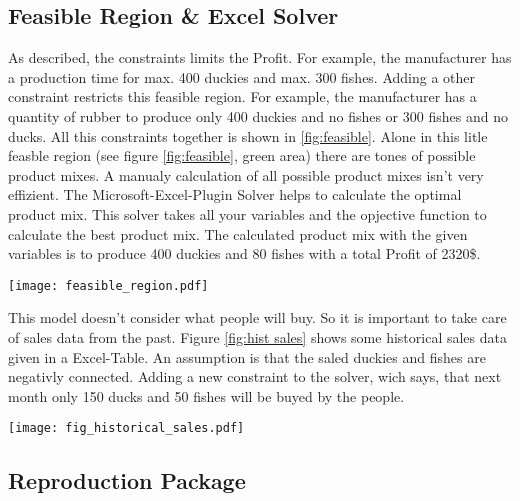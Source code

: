 \documentclass{article}
\begin{document}
\begin{multicols}{2}
\section{Feasible Region \& Excel Solver}
As described, the constraints limits the Profit. For example, the manufacturer has a production time for max. 400 duckies and max. 300 fishes. Adding a other constraint restricts this feasible region. For example, the manufacturer has a quantity of rubber to produce only 400 duckies and no fishes or 300 fishes and no ducks. All this constraints together is shown in \ref{fig:feasible}. Alone in this litle feasble region (see figure \ref{fig:feasible}, green area) there are tones of possible product mixes. A manualy calculation of all possible product mixes isn't very effizient. The Microsoft-Excel-Plugin \glqq Solver\grqq{} helps to calculate the optimal product mix. This solver takes all your variables and the opjective function to calculate the best product mix. The calculated product mix with the given variables is to produce 400 duckies and 80 fishes with a total Profit of 2320\$.

\begin{center}
\texttt{[image: feasible\_region.pdf]}
\label{fig:feasible}
\end{center}

This model doesn't consider what people will buy. So it is important to take care of sales data from the past. Figure \ref{fig:hist sales} shows some historical sales data given in a Excel-Table. An assumption is that the saled duckies and fishes are negativly connected. Adding a new constraint to the solver, wich says, that next month only 150 ducks and 50 fishes will be buyed by the people.


\begin{center}
\texttt{[image: fig\_historical\_sales.pdf]}
\label{fig:hist sales}
\end{center}

\end{multicols}
\begin{center}
\section*{Reproduction Package}
\end{center}
\end{document}
